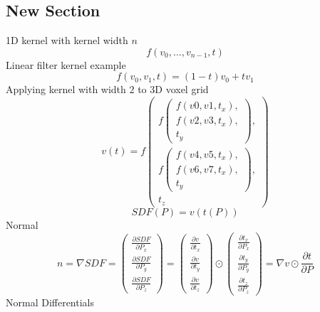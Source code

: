 \documentclass[12pt]{article}
\newcommand{\pardiff}[2]{\frac{\partial #1}{\partial #2} }
\newcommand{\newlinell}{\\[0.6em]}
\begin{document}
\subsection{New Section}
1D kernel with kernel width $n$
\begin{equation}
f(v_0, \dots, v_{n-1}, t)
\end{equation}
Linear filter kernel example
\begin{equation}
f(v_0, v_1, t) = (1 - t) v_0 + t v_1
\end{equation}
Applying kernel with width $2$ to 3D voxel grid
\begin{equation}
v(t) = f
\begin{pmatrix}
f 
\begin{pmatrix}
f(v0, v1, t_x), \\
f(v2, v3, t_x), \\
t_y
\end{pmatrix}, \\[2.0em]
f
\begin{pmatrix}
f(v4, v5, t_x), \\
f(v6, v7, t_x), \\
t_y
\end{pmatrix}, \\[2.0em]
t_z
\end{pmatrix}
\end{equation}
\begin{equation}
SDF(P) = v(t(P))
\end{equation}
Normal
\begin{equation}
n = \nabla SDF = 
\begin{pmatrix}
\pardiff{SDF}{P_x} \newlinell
\pardiff{SDF}{P_y} \newlinell
\pardiff{SDF}{P_z}
\end{pmatrix}
=
\begin{pmatrix}
\pardiff{v}{t_x} \newlinell
\pardiff{v}{t_y} \newlinell
\pardiff{v}{t_z}
\end{pmatrix}
\odot
\begin{pmatrix}
\pardiff{t_x}{P_x} \newlinell
\pardiff{t_y}{P_y} \newlinell
\pardiff{t_z}{P_z}
\end{pmatrix}
=
\nabla v \odot \pardiff{t}{P}
\end{equation}
Normal Differentials
\end{document}
